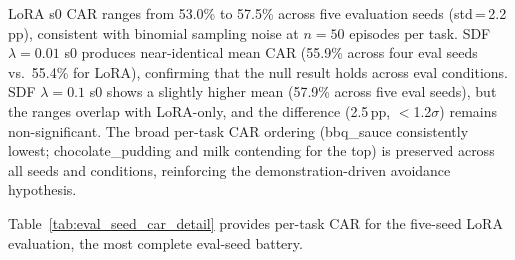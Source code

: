 \begin{table}[h]
\centering
\caption{Eval-seed robustness: aggregate CAR and TSR (\%) across evaluation seeds (200 episodes each). Dashes indicate untested seeds. CAR ranges overlap across all three conditions, confirming that SDF redundancy is not an eval-seed artifact.}
\label{tab:eval_seed_robustness}
\vspace{2pt}
\footnotesize
{}
\end{table}

LoRA s0 CAR ranges from 53.0\% to 57.5\% across five evaluation seeds (std\,=\,2.2\,pp), consistent with binomial sampling noise at $n{=}50$ episodes per task. SDF $\lambda{=}0.01$ s0 produces near-identical mean CAR (55.9\% across four eval seeds vs.\ 55.4\% for LoRA), confirming that the null result holds across eval conditions. SDF $\lambda{=}0.1$ s0 shows a slightly higher mean (57.9\% across five eval seeds), but the ranges overlap with LoRA-only, and the difference (2.5\,pp, ${<}$1.2$\sigma$) remains non-significant. The broad per-task CAR ordering (bbq\_sauce consistently lowest; chocolate\_pudding and milk contending for the top) is preserved across all seeds and conditions, reinforcing the demonstration-driven avoidance hypothesis.

Table~\ref{tab:eval_seed_car_detail} provides per-task CAR for the five-seed LoRA evaluation, the most complete eval-seed battery.

